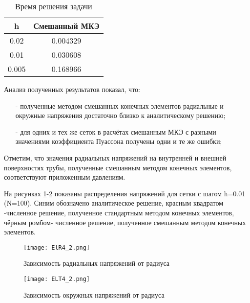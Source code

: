 \documentclass[a4paper,14pt]{extarticle}
\begin{document}
\begin{spacing}{1.0}
\begin{table}
\caption{Время решения задачи}
\label{tabl:Time4}
\begin{center}
\begin{tabular}{|c|c|}
\hline
h & Смешанный МКЭ \\
\hline
0.02  &  0.004329 \\
\hline
0.01  &  0.030608 \\
\hline
0.005 &  0.168966 \\
\hline
\end{tabular}
\end{center}
\end{table}
\end{spacing}

Анализ полученных результатов показал, что:
\begin{itemize}
\item[-]полученные методом смешанных конечных элементов радиальные и окружные напряжения достаточно близко к аналитическому решению;
\item[-]для одних и тех же сеток в расчётах смешанным МКЭ с разными значениями коэффициента Пуассона получены одни и те же ошибки;
\end{itemize}

Отметим, что значения радиальных напряжений на внутренней и внешней поверхностях трубы, полученные смешанным методом конечных элементов, соответствуют приложенным давлениям.

На рисунках \ref{4r}-\ref{4t} показаны распределения напряжений для сетки с шагом h=0.01 (N=100). Синим обозначено аналитическое решение, красным квадратом -численное решение, полученное стандартным методом конечных элементов, чёрным ромбом- численное решение, полученное смешанным методом конечных элементов. 

\newpage
\begin{figure}[h]
\begin{center}
\texttt{[image: ElR4\_2.png]}
\caption{Зависимость радиальных напряжений от радиуса}
\label{4r}
\end{center}
\end{figure}

\begin{figure}[h]
\begin{center}
\texttt{[image: ELT4\_2.png]}
\caption{Зависимость окружных напряжений от радиуса}
\label{4t}
\end{center}
\end{figure}
\end{document}
